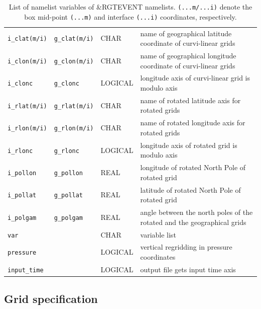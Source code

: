 \documentclass[11pt,twoside]{report}
\begin{document}
\begin{table}
\begin{tabular}{lllp{7.5cm}}
\verb|i_clat(m/i)| & \verb|g_clat(m/i)| & CHAR &  name of geographical latitude coordinate of curvi-linear grids\\
\verb|i_clon(m/i)| & \verb|g_clon(m/i)| & CHAR &  name of geographical longitude coordinate of curvi-linear grids\\
\verb|i_clonc|     & \verb|g_clonc|      & LOGICAL   & longitude axis of curvi-linear grid is modulo axis\\ \hline
\verb|i_rlat(m/i)| & \verb|g_rlat(m/i)| & CHAR &  name of rotated latitude axis for rotated grids\\
\verb|i_rlon(m/i)| & \verb|g_rlon(m/i)| & CHAR &  name of rotated longitude axis for rotated grids\\
\verb|i_rlonc|     & \verb|g_rlonc| & LOGICAL & longitude axis of rotated grid is modulo axis\\\hline
\verb|i_pollon|   & \verb|g_pollon| & REAL & longitude of rotated North Pole of rotated grid\\
\verb|i_pollat|   & \verb|g_pollat| & REAL & latitude of rotated North Pole of rotated grid \\
\verb|i_polgam|   & \verb|g_polgam| & REAL & angle between the north poles of the rotated and the geographical grids\\\hline
\verb|var|         & \verb|| & CHAR  & variable list\\
\verb|pressure  | & \verb|| & LOGICAL &vertical regridding in pressure coordinates \\
\verb|input_time| & \verb|| & LOGICAL & output file gets input time axis\\\hline\hline
\end{tabular}
\caption{ List of namelist variables of {\rm \&RGTEVENT} namelists.  
{\tt(...m/...i)} denote the box mid-point {\tt (...m)} and 
interface {\tt (...i)} coordinates, respectively.\label{TabGRIDNML}}
\end{table}
\subsection{Grid specification\label{GRIDSPEC}}
\end{document}
